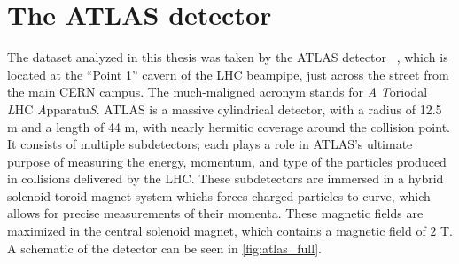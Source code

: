 

\chapter[The ATLAS detector][Top of Page Title]{The ATLAS detector} \label{Chapter-ATLAS}

The dataset analyzed in this thesis was taken by the ATLAS detector ~\cite{PERF-2007-01}, which is located at the ``Point 1'' cavern of the LHC beampipe, just across the street from the main CERN campus.
The much-maligned acronym stands for \textit{A} \textit{T}oriodal \textit{L}HC \textit{A}pparatu\textit{S}.
ATLAS is a massive cylindrical detector, with a radius of 12.5 m and a length of 44 m, with nearly hermitic coverage around the collision point.
It consists of multiple subdetectors; each plays a role in ATLAS's ultimate purpose of measuring the energy, momentum, and type of the particles produced in collisions delivered by the LHC.
These subdetectors are immersed in a hybrid solenoid-toroid magnet system whichs forces charged particles to curve, which allows for precise measurements of their momenta.
These magnetic fields are maximized in the central solenoid magnet, which contains a magnetic field of $2$ T.
A schematic of the detector can be seen in \ref{fig:atlas_full}.

